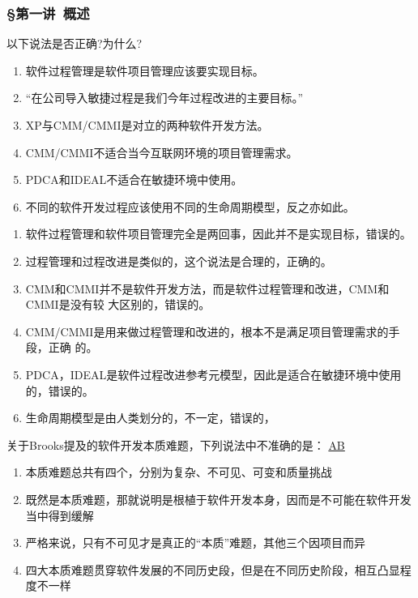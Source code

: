 \subsubsection*{\S 第一讲\ 概述}
\setcounter{problemname}{0}

\begin{problem}
以下说法是否正确?为什么?
\begin{enumerate}[label=\arabic*.]
    \item 软件过程管理是软件项目管理应该要实现目标。
    \item “在公司导入敏捷过程是我们今年过程改进的主要目标。”
    \item XP与CMM/CMMI是对立的两种软件开发方法。
    \item CMM/CMMI不适合当今互联网环境的项目管理需求。
    \item PDCA和IDEAL不适合在敏捷环境中使用。
    \item 不同的软件开发过程应该使用不同的生命周期模型，反之亦如此。
\end{enumerate}
\end{problem}

\begin{solution}
\begin{enumerate}[label=\arabic*.]
    \item 软件过程管理和软件项目管理完全是两回事，因此并不是实现目标，错误的。
    \item 过程管理和过程改进是类似的，这个说法是合理的，正确的。
    \item CMM和CMMI并不是软件开发方法，而是软件过程管理和改进，CMM和CMMI是没有较
    大区别的，错误的。
    \item CMM/CMMI是用来做过程管理和改进的，根本不是满足项目管理需求的手段，正确
    的。
    \item PDCA，IDEAL是软件过程改进参考元模型，因此是适合在敏捷环境中使用的，错误的。
    \item 生命周期模型是由人类划分的，不一定，错误的，
\end{enumerate}
\end{solution}



\begin{problem}
	关于Brooks提及的软件开发本质难题，下列说法中不准确的是：
	\uline{AB}    
        \begin{enumerate}[label=\Alph*.]
            \item 本质难题总共有四个，分别为复杂、不可见、可变和质量挑战
            \item 既然是本质难题，那就说明是根植于软件开发本身，因而是不可能在软件开发当中得到缓解
            \item 严格来说，只有不可见才是真正的“本质”难题，其他三个因项目而异
            \item 四大本质难题贯穿软件发展的不同历史段，但是在不同历史阶段，相互凸显程度不一样
        \end{enumerate}
\end{problem}





